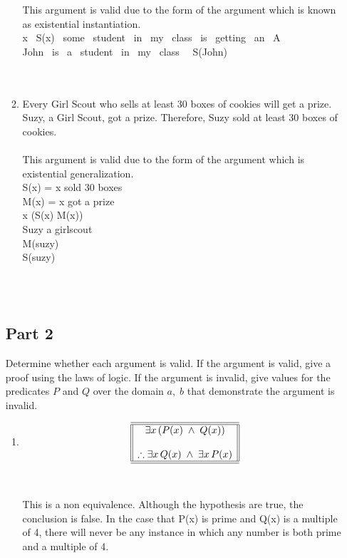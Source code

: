 \begin{enumerate}
\begin{enumerate}[label=(\alph*)]
This argument is valid due to the form of the argument which is known as existential instantiation. \\

\exists x \ S(x) \ some \ student \ in \ my \ class \ is \ getting \ an \ A \\

\therefore John \ is \ a \ student \ in \ my \ class \ \land \ S(John) \\

\\\\
\item Every Girl Scout who sells at least 30 boxes of cookies will get a prize. Suzy, a Girl Scout, got a prize. Therefore, Suzy sold at least 30 boxes of cookies.\\\\
This argument is valid due to the form of the argument which is existential generalization.\\ 

S(x) = x sold 30 boxes \\

M(x) = x got a prize \\

\forall x (S(x) \to M(x))  \\ 

Suzy a girlscout  \\

M(suzy) \\

\therefore S(suzy)

\\\\
 \end{enumerate}

 \subsection*{Part 2}
Determine whether each argument is valid. If the argument is valid, give a proof using the laws of logic. If the argument is invalid, give values for the predicates $P$ and $Q$ over the domain ${a,\; b}$ that demonstrate the argument is invalid.\\
 \begin{enumerate}[label=(\alph*)]
\item \[
\begin{array}{||c||}
\hline \hline
\exists x\, (P(x)\; \land \;Q(x) )\\
\\
\therefore \exists x\, Q(x)\; \land\; \exists x \,P(x) \\
\hline \hline
\end{array}
\]\\\\
 This is a non equivalence. Although the hypothesis are true, the conclusion is false. In the case that P(x) is prime and Q(x) is a multiple of 4, there will never be any instance in which any number is both prime and a multiple of 4.
 \\\\



\end{enumerate}
\end{enumerate}
